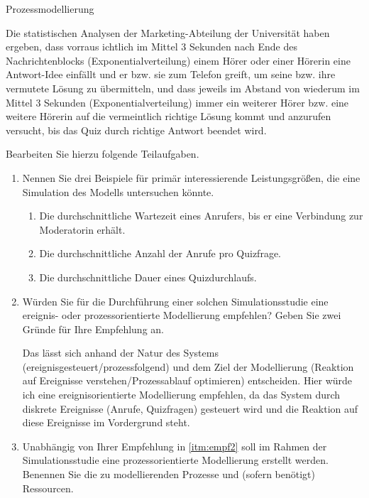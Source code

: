 \documentclass{article}
\begin{document}
\begin{exercise}{Prozessmodellierung}
\begin{itemize}
  \end{itemize}
  \par Die statistischen Analysen der Marketing-Abteilung der Universität haben ergeben, dass vorraus ichtlich im Mittel 3 Sekunden nach Ende des Nachrichtenblocks (Exponentialverteilung) einem Hörer oder einer Hörerin eine Antwort-Idee einfällt und er bzw. sie zum Telefon greift, um seine bzw. ihre vermutete Lösung zu übermitteln, und dass jeweils im Abstand von wiederum im Mittel 3 Sekunden (Exponentialverteilung) immer ein weiterer Hörer bzw. eine weitere Hörerin auf die vermeintlich richtige Lösung kommt und anzurufen versucht, bis das Quiz durch richtige Antwort beendet wird.

  Bearbeiten Sie hierzu folgende Teilaufgaben.
  \begin{enumerate}
    \item\label{itm:prim2} Nennen Sie drei Beispiele für primär interessierende Leistungsgrößen, die eine Simulation des Modells untersuchen könnte.
          \begin{solution}
            \begin{enumerate}
              \item Die durchschnittliche Wartezeit eines Anrufers, bis er eine Verbindung zur Moderatorin erhält.
              \item Die durchschnittliche Anzahl der Anrufe pro Quizfrage.
              \item Die durchschnittliche Dauer eines Quizdurchlaufs.
            \end{enumerate}
          \end{solution}
    \item\label{itm:empf2} Würden Sie für die Durchführung einer solchen Simulationsstudie eine ereignis- oder prozessorientierte Modellierung empfehlen? Geben Sie zwei Gründe für Ihre Empfehlung an.
          \begin{solution}
            Das lässt sich anhand der Natur des Systems (ereignisgesteuert/prozessfolgend) und dem Ziel der Modellierung (Reaktion auf Ereignisse verstehen/Prozessablauf optimieren) entscheiden. Hier würde ich eine ereignisorientierte Modellierung empfehlen, da das System durch diskrete Ereignisse (Anrufe, Quizfragen) gesteuert wird und die Reaktion auf diese Ereignisse im Vordergrund steht.
          \end{solution}
    \item\label{itm:ent2} Unabhängig von Ihrer Empfehlung in \ref{itm:empf2} soll im Rahmen der Simulationsstudie eine prozessorientierte Modellierung erstellt werden. Benennen Sie die zu modellierenden Prozesse und (sofern benötigt) Ressourcen.

\end{enumerate}
\end{exercise}
\end{document}
